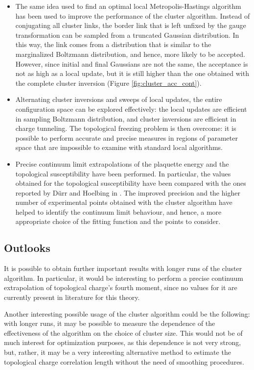 \begin{itemize}
    \item
        The same idea used to find an optimal local Metropolis-Hastings algorithm has been used to improve the performance of the cluster algorithm.
        Instead of conjugating all cluster links, the border link that is left unfixed by the gauge transformation can be sampled from a truncated Gaussian distribution.
        In this way, the link comes from a distribution that is similar to the marginalized Boltzmann distribution, and hence, more likely to be accepted.
        However, since initial and final Gaussians are not the same, the acceptance is not as high as a local update,
        but it is still higher than the one obtained with the complete cluster inversion (Figure \ref{fig:cluster_acc_cont}).
    \item
        Alternating cluster inversions and sweeps of local updates, the entire configuration space can be explored effectively:
        the local updates are efficient in sampling Boltzmann distribution, and cluster inversions are efficient in charge tunneling.
        The topological freezing problem is then overcome:
        it is possible to perform accurate and precise measures in regions of parameter space that are impossible to examine with standard local algorithms.
    \item
        Precise continuum limit extrapolations of the plaquette energy and the topological susceptibility have been performed.
        In particular, the values obtained for the topological susceptibility have been compared with the ones reported by
        D\"urr and Hoelbing in \cite{durr-hoelbling:2005}.
        The improved precision and the higher number of experimental points obtained with the cluster algorithm have helped to identify the continuum limit behaviour,
        and hence, a more appropriate choice of the fitting function and the points to consider.
\end{itemize}

\subsection*{Outlooks}
It is possible to obtain further important results with longer runs of the cluster algorithm.
In particular, it would be interesting to perform a precise continuum extrapolation of topological charge's fourth moment,
since no values for it are currently present in literature for this theory.

Another interesting possible usage of the cluster algorithm could be the following:
with longer runs, it may be possible to measure the dependence of the effectiveness of the algorithm on the choice of cluster size.
This would not be of much interest for optimization purposes, as this dependence is not very strong,
but, rather, it may be a very interesting alternative method to estimate the topological charge correlation length without the need of smoothing procedures.

